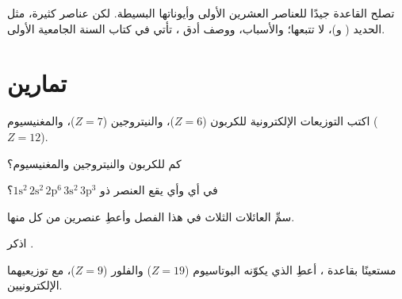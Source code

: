 \begin{remark}\label{rem:g10:electron-shells:limits}
تصلح القاعدة جيدًا للعناصر العشرين الأولى وأيوناتها البسيطة. لكن عناصر كثيرة،
مثل الحديد ( و)، لا تتبعها؛ والأسباب، ووصف أدق
، تأتي في كتاب السنة الجامعية الأولى.
\end{remark}

\section{تمارين}

\begin{exercise}[$\star$]\label{exo:g10:electron-shells:1}
اكتب التوزيعات الإلكترونية للكربون ($Z = 6$)، والنيتروجين ($Z = 7$)،
والمغنيسيوم ($Z = 12$).
\end{exercise}

\begin{exercise}[$\star$]\label{exo:g10:electron-shells:2}
كم  للكربون والنيتروجين والمغنيسيوم؟
\end{exercise}

\begin{exercise}[$\star$]\label{exo:g10:electron-shells:3}
في أي  وأي  يقع العنصر ذو 
$1\mathrm{s}^2\,2\mathrm{s}^2\,2\mathrm{p}^6\,3\mathrm{s}^2\,3\mathrm{p}^3$؟
\end{exercise}

\begin{exercise}[$\star$]\label{exo:g10:electron-shells:4}
سمِّ العائلات الثلاث في هذا الفصل وأعطِ عنصرين من كل منها.
\end{exercise}

\begin{exercise}[$\star$]\label{exo:g10:electron-shells:5}
اذكر .
\end{exercise}

\begin{exercise}[$\star\star$]\label{exo:g10:electron-shells:6}
مستعينًا بقاعدة ، أعطِ  الذي يكوّنه البوتاسيوم ($Z = 19$)
والفلور ($Z = 9$)، مع توزيعيهما الإلكترونيين.
\end{exercise}

